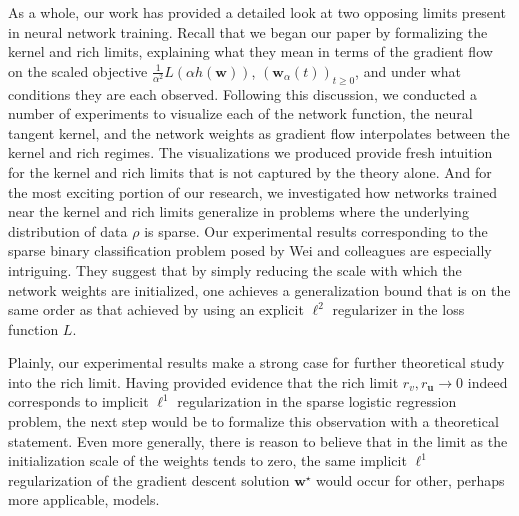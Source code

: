 \documentclass{article}
\begin{document}
As a whole, our work has provided a detailed look at two opposing limits present in neural network training. Recall that we began our paper by formalizing the kernel and rich limits, explaining what they mean in terms of the gradient flow on the scaled objective $\frac{1}{\alpha^2}L(\alpha h(\boldsymbol{w}))$, $(\boldsymbol{w}_{\alpha}(t))_{t \geq 0}$, and under what conditions they are each observed. Following this discussion, we conducted a number of experiments to visualize each of the network function, the neural tangent kernel, and the network weights as gradient flow interpolates between the kernel and rich regimes. The visualizations we produced provide fresh intuition for the kernel and rich limits that is not captured by the theory alone. And for the most exciting portion of our research, we investigated how networks trained near the kernel and rich limits generalize in problems where the underlying distribution of
data $\rho$ is sparse. Our experimental results corresponding to the sparse binary classification problem posed by Wei and colleagues are especially intriguing. They suggest that by simply reducing the scale with which the network weights are initialized, one achieves a generalization bound that is on the same order as that achieved by using an explicit $\ell^2$ regularizer in the loss function $L$.

Plainly, our experimental results make a strong case for further theoretical study into the rich limit. Having provided evidence that the rich limit $r_{v}, r_{\boldsymbol{u}} \rightarrow 0$ indeed corresponds to implicit $\ell^1$ regularization in the sparse logistic regression problem, the next step would be to formalize this observation with a theoretical statement. Even more generally, there is reason to believe that in the limit as the initialization scale of the weights tends to zero, the same implicit $\ell^1$ regularization of the gradient descent solution $\boldsymbol{w}^{\star}$ would occur for other, perhaps more applicable, models. 

\pagebreak



\end{document}
